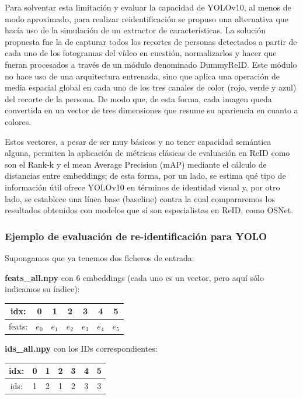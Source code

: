 \documentclass[12pt, a4paper, twoside]{article}
\begin{document}
 	Para solventar esta limitación y evaluar la capacidad de YOLOv10, al menos de modo aproximado, para realizar reidentificación se propuso una alternativa que hacía uso de la simulación de un extractor de características. La solución propuesta fue la de capturar todos los recortes de personas detectados a partir de cada uno de los fotogramas del vídeo en cuestión, normalizarlos y hacer que fueran procesados a través de un módulo denominado DummyReID. Este módulo no hace uso de una arquitectura entrenada, sino que aplica una operación de media espacial global en cada uno de los tres canales de color (rojo, verde y azul) del recorte de la persona. De modo que, de esta forma, cada imagen queda convertida en un vector de tres dimensiones que resume su apariencia en cuanto a colores.
 	
 	Estos vectores, a pesar de ser muy básicos y no tener capacidad semántica alguna, permiten la aplicación de métricas clásicas de evaluación en ReID como son el Rank-k y el mean Average Precision (mAP) mediante el cálculo de distancias entre embeddings; de esta forma, por un lado, se estima qué tipo de información útil ofrece YOLOv10 en términos de identidad visual y, por otro lado, se establece una línea base (baseline) contra la cual compararemos los resultados obtenidos con modelos que sí son especialistas en ReID, como OSNet.
 	
 	
 	\subsubsection{Ejemplo de evaluación de re-identificación para YOLO}
 	
 	Supongamos que ya tenemos dos ficheros de entrada:
 	
 	\medskip
 	\noindent
 	\textbf{feats\_all.npy} con 6 embeddings (cada uno es un vector, pero aquí sólo indicamos su índice):
 	\begin{center}
 		\begin{tabular}{c|cccccc}
 			idx:   & 0 & 1 & 2 & 3 & 4 & 5 \\ \hline
 			feats: & $e_0$ & $e_1$ & $e_2$ & $e_3$ & $e_4$ & $e_5$
 		\end{tabular}
 	\end{center}
 	
 	\medskip
 	\noindent
 	\textbf{ids\_all.npy} con los IDs correspondientes:
 	\begin{center}
 		\begin{tabular}{c|cccccc}
 			idx: & 0 & 1 & 2 & 3 & 4 & 5 \\ \hline
 			ids: & 1 & 2 & 1 & 2 & 3 & 3
 		\end{tabular}
 	\end{center}
 	
\end{document}
